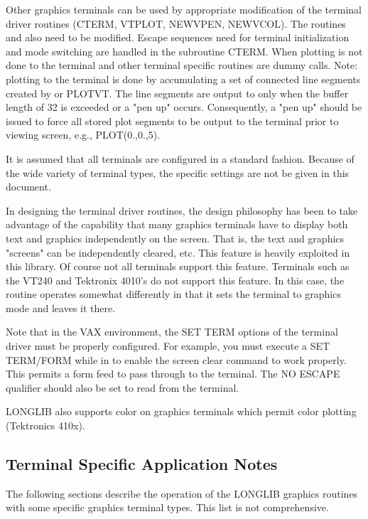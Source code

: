 \documentclass[11pt]{report}
\begin{document}
Other graphics terminals can be used by appropriate modification of the
terminal driver routines (CTERM, VTPLOT, NEWVPEN, NEWVCOL).  The routines
 and  also need to be modified. 
Escape sequences need for terminal initialization and mode switching
are handled in the subroutine CTERM.  When plotting is not done to the
terminal  and other terminal specific routines are dummy
calls.  Note: plotting to the terminal is done by accumulating a set
of connected line segments created by  or PLOTVT.  The line
segments are output to  only when the buffer length of 32
is exceeded or a "pen up" occurs.  Consequently, a "pen up" should be
issued to force all stored plot segments to be output to the terminal
prior to viewing screen, e.g., PLOT(0.,0.,5).

It is assumed that all terminals are configured in a standard fashion.
Because of the wide variety of terminal types, the specific settings
are not be given in this document.

In designing the terminal driver routines, the design philosophy has
been to take advantage of the capability that many graphics terminals
have to display both text and graphics independently on the screen.
That is, the text and graphics "screens" can be independently cleared,
etc.  This feature is heavily exploited in this library.  Of course
not all terminals support this feature.  Terminals such as the VT240
and Tektronix 4010's do not support this feature.  In this case,
the  routine operates somewhat differently in that it sets
the terminal to graphics mode and leaves it there.

Note that in the VAX environment, the SET TERM options of the terminal
driver must be properly configured.  For example, you must execute a
SET TERM/FORM while in  to enable the screen clear command to
work properly.  This permits a form feed to pass through to the
terminal.  The NO ESCAPE qualifier should also be set to read from the
terminal.

LONGLIB also supports color on graphics terminals which permit color
plotting (Tektronics 410x).

\subsection{Terminal Specific Application Notes}

The following sections describe the operation of the LONGLIB graphics
routines with some specific graphics terminal types.  This list is
not comprehensive.
\end{document}
